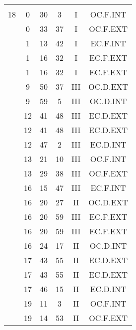 \documentclass[12pt, a4paper]{article}
\begin{document}
\begin{multicols}{3}
{\begin{tabular}{c c c c c c}
	 	 	 	 & & & & & \\%
	 	 	 	18 & 0 & 30 & 3 & I & OC.F.INT\\%
	 	 	 	 & 0 & 33 & 37 & I & OC.F.EXT\\%
	 	 	 	 & 1 & 13 & 42 & I & EC.F.INT\\%
	 	 	 	 & 1 & 16 & 32 & I & EC.F.EXT\\%
	 	 	 	 & 1 & 16 & 32 & I & EC.F.EXT\\%
	 	 	 	 & 9 & 50 & 37 & III & OC.D.EXT\\%
	 	 	 	 & 9 & 59 & 5 & III & OC.D.INT\\%
	 	 	 	 & 12 & 41 & 48 & III & EC.D.EXT\\%
	 	 	 	 & 12 & 41 & 48 & III & EC.D.EXT\\%
	 	 	 	 & 12 & 47 & 2 & III & EC.D.INT\\%
	 	 	 	 & 13 & 21 & 10 & III & OC.F.INT\\%
	 	 	 	 & 13 & 29 & 38 & III & OC.F.EXT\\%
	 	 	 	 & 16 & 15 & 47 & III & EC.F.INT\\%
	 	 	 	 & 16 & 20 & 27 & II & OC.D.EXT\\%
	 	 	 	 & 16 & 20 & 59 & III & EC.F.EXT\\%
	 	 	 	 & 16 & 20 & 59 & III & EC.F.EXT\\%
	 	 	 	 & 16 & 24 & 17 & II & OC.D.INT\\%
	 	 	 	 & 17 & 43 & 55 & II & EC.D.EXT\\%
	 	 	 	 & 17 & 43 & 55 & II & EC.D.EXT\\%
	 	 	 	 & 17 & 46 & 15 & II & EC.D.INT\\%
	 	 	 	 & 19 & 11 & 3 & II & OC.F.INT\\%
	 	 	 	 & 19 & 14 & 53 & II & OC.F.EXT\\%

\end{tabular}}
\end{multicols}
\end{document}
